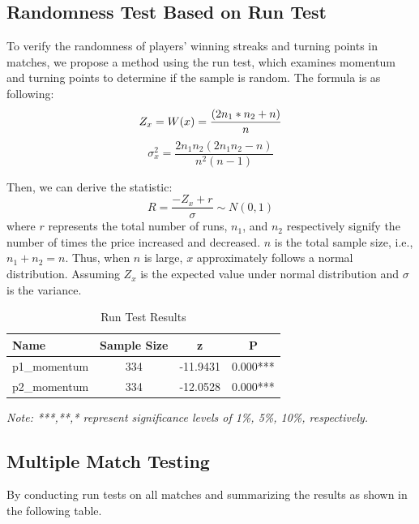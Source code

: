 \documentclass[12pt]{article}%
\begin{document}
\subsection{Randomness Test Based on Run Test}
To verify the randomness of players' winning streaks and turning points in matches, we propose a method using the run test, which examines momentum and turning points to determine if the sample is random. The formula is as following: 
\begin{equation}
	Z_x=W(x)=\frac{(2n_1*n_2+n)}{n} \\
\end{equation}
\begin{equation}
\sigma^2_x=\frac{2n_1n_2(2n_1n_2-n)}{n^2(n-1)}
\end{equation}

Then, we can derive the statistic:
\begin{equation}
	R=\frac{-Z_x+r}{\sigma}\sim N(0,1)
\end{equation}
where \( r \) represents the total number of runs, \( n_1 \), and \( n_2 \) respectively signify the number of times the price increased and decreased. \( n \) is the total sample size, i.e., \( n_1 + n_2 = n \). Thus, when \( n \) is large, \( x \) approximately follows a normal distribution. Assuming \( Z_x \) is the expected value under normal distribution and \( \sigma \) is the variance.

\begin{table}[htbp]
	\centering
	\caption{Run Test Results}
			\label{22222}
	\begin{tabular}{lccc}
		\toprule
		\rowcolor{orange!40}
		Name & Sample Size & z & P \\
		\midrule
		p1\_momentum & 334 & -11.9431 & 0.000*** \\
		p2\_momentum & 334 & -12.0528 & 0.000*** \\
		\bottomrule

	\end{tabular}
	
	\smallskip
	\textit{Note: ***,**,* represent significance levels of 1\%, 5\%, 10\%, respectively.}
\end{table}



\subsection{ Multiple Match Testing}
By conducting run tests on all matches and summarizing the results as shown in the following table.
\end{document}
